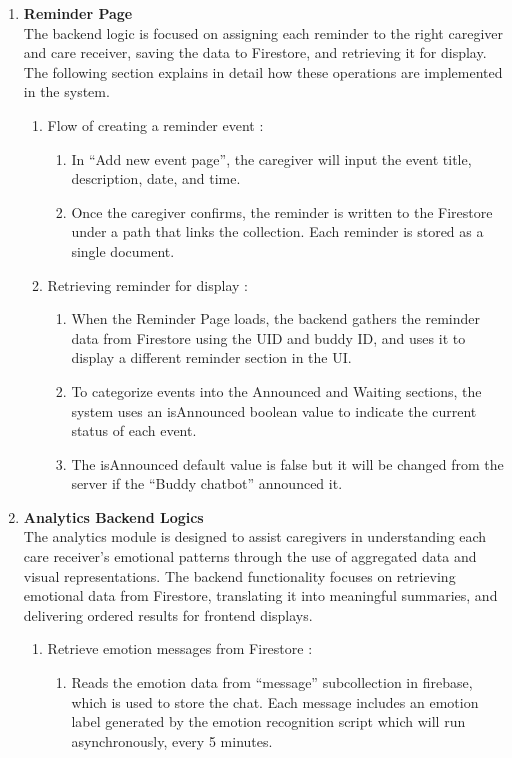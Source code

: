 \begin{enumerate}[leftmargin=2.2cm]
		\item\textbf{Reminder Page} 
		\\The backend logic is focused on assigning each reminder to the right caregiver and care receiver, saving the data to Firestore, and retrieving it for display. The following section explains in detail how these operations are implemented in the system.
		\begin{enumerate}[label=\arabic*.]
			\item Flow of creating a reminder event :
			\begin{enumerate}[label=\alph*.] 
				\item In “Add new event page”, the caregiver will input the event title, description, date, and time. 
				\item Once the caregiver confirms, the reminder is written to the Firestore under a path that links the collection. Each reminder is stored as a single document.
			\end{enumerate}
			
			\item Retrieving reminder for display :
			\begin{enumerate}[label=\alph*.] 
				\item When the Reminder Page loads, the backend gathers the reminder data from Firestore using the UID and buddy ID, and uses it to display a different reminder section in the UI. 
				\item To categorize events into the Announced and Waiting sections, the system uses an isAnnounced boolean value to indicate the current status of each event. 
				\item The isAnnounced default value is false but it will be changed from the server if the “Buddy chatbot” announced it. 
			\end{enumerate}
		\end{enumerate}
		
		\item\textbf{Analytics Backend Logics} 
		\\The analytics module is designed to assist caregivers in understanding each care receiver's emotional patterns through the use of aggregated data and visual representations. The backend functionality focuses on retrieving emotional data from Firestore, translating it into meaningful summaries, and delivering ordered results for frontend displays.
		
		\begin{enumerate}[label=\arabic*.]
			\item Retrieve emotion messages from Firestore :
			\begin{enumerate}[label=\alph*.] 
				\item Reads the emotion data from “message” subcollection in firebase, which is used to store the chat. Each message includes an emotion label generated by the emotion recognition script which will run asynchronously, every 5 minutes.
			\end{enumerate}
		

\end{enumerate}
\end{enumerate}
